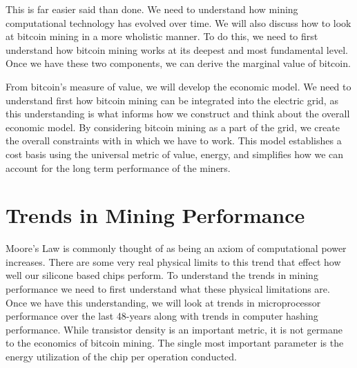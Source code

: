 \documentclass[runningheads]{llncs}
\begin{document}
This is far easier said than done.
We need to understand how mining computational technology has evolved over time.
We will also discuss how to look at bitcoin mining in a more wholistic manner.
To do this, we need to first understand how bitcoin mining works at its deepest and most fundamental level.
Once we have these two components, we can derive the marginal value of bitcoin.

From bitcoin's  measure of value, we will develop the economic model.
We need to understand first how bitcoin mining can be integrated into the electric grid, as this understanding is what informs how we construct and think about the overall economic model.
By considering bitcoin mining as a part of the grid, we create the overall constraints with in which we have to work.
This model establishes a cost basis using the universal metric of value, energy, and simplifies how we can account for the long term performance of the miners.


\section{Trends in Mining Performance}
Moore's Law is commonly thought of as being an axiom of computational power increases.
There are some very real physical limits to this trend that effect how well our silicone based chips perform.
To understand the trends in mining performance we need to first understand what these physical limitations are.
Once we have this understanding, we will look at trends in microprocessor performance over the last 48-years along with trends in computer hashing performance.
While transistor density is an important metric, it is not germane to the economics of bitcoin mining.
The single most important parameter is the energy utilization of the chip per operation conducted.
\end{document}
